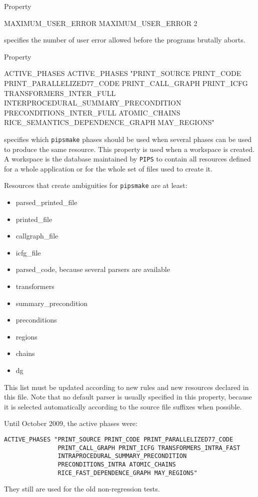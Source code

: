 \documentclass[a4paper]{report}
\newcommand{\Pips}{\texttt{PIPS}}
\newcommand{\Pipsmake}{\texttt{pipsmake}}
\begin{document}
Property
\begin{PipsProp}{MAXIMUM_USER_ERROR}
MAXIMUM_USER_ERROR 2
\end{PipsProp}
specifies the number of user error allowed before the programs brutally aborts.

Property
\begin{PipsProp}{ACTIVE_PHASES}
ACTIVE_PHASES "PRINT_SOURCE PRINT_CODE PRINT_PARALLELIZED77_CODE PRINT_CALL_GRAPH PRINT_ICFG TRANSFORMERS_INTER_FULL INTERPROCEDURAL_SUMMARY_PRECONDITION PRECONDITIONS_INTER_FULL ATOMIC_CHAINS RICE_SEMANTICS_DEPENDENCE_GRAPH MAY_REGIONS"
\end{PipsProp}
specifies which \Pipsmake{} phases should be used when several phases
can be used to produce the same resource. This property is used when a
workspace is created. A workspace is the database maintained by
\Pips{} to contain all resources defined for a whole application or
for the whole set of files used to create it.

Resources that create ambiguities for \Pipsmake{} are at least:
\begin{itemize}
\item parsed\_printed\_file
\item printed\_file
\item callgraph\_file
\item icfg\_file
\item parsed\_code, because several parsers are available
\item transformers
\item summary\_precondition
\item preconditions
\item regions
\item chains
\item dg
\end{itemize}
This list must be updated according to new rules and new resources
declared in this file. Note that no default parser is usually
specified in this property, because it is selected automatically
according to the source file suffixes when possible.

Until October 2009, the active phases were:
\begin{verbatim}
ACTIVE_PHASES "PRINT_SOURCE PRINT_CODE PRINT_PARALLELIZED77_CODE
               PRINT_CALL_GRAPH PRINT_ICFG TRANSFORMERS_INTRA_FAST
               INTRAPROCEDURAL_SUMMARY_PRECONDITION
               PRECONDITIONS_INTRA ATOMIC_CHAINS
               RICE_FAST_DEPENDENCE_GRAPH MAY_REGIONS"
\end{verbatim}
They still are used for the old non-regression tests.
\end{document}
